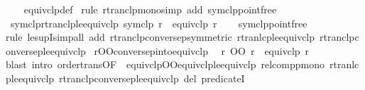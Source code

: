 \begin{isabellebody}
%
\isadelimproof
\ \ %
\endisadelimproof
%
\isatagproof
{}\isamarkupfalse%
\ equivclp{\isacharunderscore}{\kern0pt}def\ \isamarkupfalse%
{\isacharparenleft}{\kern0pt}rule\ rtranclp{\isacharunderscore}{\kern0pt}mono{\isacharparenright}{\kern0pt}{\isacharparenleft}{\kern0pt}simp\ add{\isacharcolon}{\kern0pt}\ symclp{\isacharunderscore}{\kern0pt}pointfree{\isacharparenright}{\kern0pt}%
\endisatagproof
{\isafoldproof}%
%
\isadelimproof
\isanewline
%
\endisadelimproof
\isanewline
{}\isamarkupfalse%
\ symclp{\isacharunderscore}{\kern0pt}rtranclp{\isacharunderscore}{\kern0pt}le{\isacharunderscore}{\kern0pt}equivclp{\isacharcolon}{\kern0pt}\ {\isachardoublequoteopen}symclp\ r\isactrlsup {\isacharasterisk}{\kern0pt}\isactrlsup {\isacharasterisk}{\kern0pt}\ {\isasymle}\ equivclp\ r{\isachardoublequoteclose}\isanewline
%
\isadelimproof
\ \ %
\endisadelimproof
%
\isatagproof
{}\isamarkupfalse%
\ symclp{\isacharunderscore}{\kern0pt}pointfree\isanewline
\ \ \isamarkupfalse%
{\isacharparenleft}{\kern0pt}rule\ le{\isacharunderscore}{\kern0pt}supI{\isacharparenright}{\kern0pt}{\isacharparenleft}{\kern0pt}simp{\isacharunderscore}{\kern0pt}all\ add{\isacharcolon}{\kern0pt}\ rtranclp{\isacharunderscore}{\kern0pt}conversep{\isacharbrackleft}{\kern0pt}symmetric{\isacharbrackright}{\kern0pt}\ rtranlcp{\isacharunderscore}{\kern0pt}le{\isacharunderscore}{\kern0pt}equivclp\ rtranclp{\isacharunderscore}{\kern0pt}conversep{\isacharunderscore}{\kern0pt}le{\isacharunderscore}{\kern0pt}equivclp{\isacharparenright}{\kern0pt}%
\endisatagproof
{\isafoldproof}%
%
\isadelimproof
\isanewline
%
\endisadelimproof
\isanewline
{}\isamarkupfalse%
\ r{\isacharunderscore}{\kern0pt}OO{\isacharunderscore}{\kern0pt}conversep{\isacharunderscore}{\kern0pt}into{\isacharunderscore}{\kern0pt}equivclp{\isacharcolon}{\kern0pt}\isanewline
\ \ {\isachardoublequoteopen}r\isactrlsup {\isacharasterisk}{\kern0pt}\isactrlsup {\isacharasterisk}{\kern0pt}\ OO\ r{\isasyminverse}{\isasyminverse}\isactrlsup {\isacharasterisk}{\kern0pt}\isactrlsup {\isacharasterisk}{\kern0pt}\ {\isasymle}\ equivclp\ r{\isachardoublequoteclose}\isanewline
%
\isadelimproof
\ \ %
\endisadelimproof
%
\isatagproof
{}\isamarkupfalse%
{\isacharparenleft}{\kern0pt}blast\ intro{\isacharcolon}{\kern0pt}\ order{\isacharunderscore}{\kern0pt}trans{\isacharbrackleft}{\kern0pt}OF\ {\isacharunderscore}{\kern0pt}\ equivclp{\isacharunderscore}{\kern0pt}OO{\isacharunderscore}{\kern0pt}equivclp{\isacharunderscore}{\kern0pt}le{\isacharunderscore}{\kern0pt}equivclp{\isacharbrackright}{\kern0pt}\ relcompp{\isacharunderscore}{\kern0pt}mono\ rtranlcp{\isacharunderscore}{\kern0pt}le{\isacharunderscore}{\kern0pt}equivclp\ rtranclp{\isacharunderscore}{\kern0pt}conversep{\isacharunderscore}{\kern0pt}le{\isacharunderscore}{\kern0pt}equivclp\ del{\isacharcolon}{\kern0pt}\ predicate{}I{\isacharparenright}{\kern0pt}%

\end{isabellebody}
